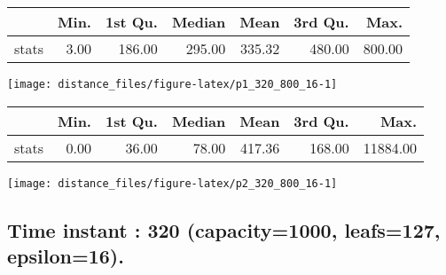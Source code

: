 \documentclass[
  9pt,
  landscape]{article}
\begin{document}
\begin{minipage}{0.5\textwidth} 
\centering 
\begin{tabular}{rrrrrrr}
  \hline
 & Min. & 1st Qu. & Median & Mean & 3rd Qu. & Max. \\ 
  \hline
stats & 3.00 & 186.00 & 295.00 & 335.32 & 480.00 & 800.00 \\ 
   \hline
\end{tabular}
\vspace{0.5cm} 


\texttt{[image: distance\_files/figure-latex/p1\_320\_800\_16-1]} 

\end{minipage} 
\begin{minipage}{0.5\textwidth} 
\centering 
\begin{tabular}{rrrrrrr}
  \hline
 & Min. & 1st Qu. & Median & Mean & 3rd Qu. & Max. \\ 
  \hline
stats & 0.00 & 36.00 & 78.00 & 417.36 & 168.00 & 11884.00 \\ 
   \hline
\end{tabular}
\vspace{0.5cm} 


\texttt{[image: distance\_files/figure-latex/p2\_320\_800\_16-1]} 

\end{minipage}

\pagebreak

\hypertarget{time-instant-320-capacity1000-leafs127-epsilon16.}{%
\subsection{Time instant : 320 (capacity=1000, leafs=127,
epsilon=16).}\label{time-instant-320-capacity1000-leafs127-epsilon16.}}
\end{document}
